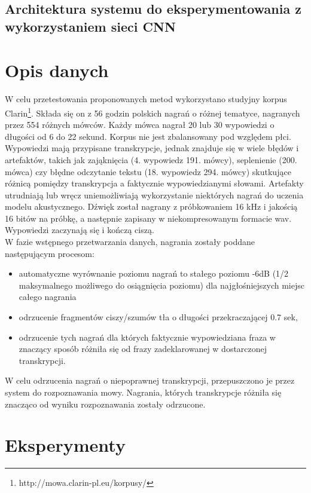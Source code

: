 \documentclass[11pt]{article}
\begin{document}
	\subsection{ Architektura systemu do eksperymentowania z wykorzystaniem sieci CNN }
		
\section{Opis danych}
	\label{sec:opis_danych}

	W celu przetestowania proponowanych metod wykorzystano studyjny korpus Clarin\footnote{http://mowa.clarin-pl.eu/korpusy/}. Składa się on z 56 godzin polskich nagrań o różnej tematyce, nagranych przez 554 różnych mówców. Każdy mówca nagrał 20 lub 30 wypowiedzi o długości od 6 do 22 sekund. Korpus nie jest zbalansowany pod względem płci. Wypowiedzi mają przypisane transkrypcje, jednak znajduje się w wiele błędów i artefaktów, takich jak zająknięcia (4. wypowiedz 191. mówcy), seplenienie (200. mówca) czy błędne odczytanie tekstu (18. wypowiedz 294. mówcy) skutkujące różnicą pomiędzy transkrypcja a faktycznie wypowiedzianymi słowami. Artefakty utrudniają lub wręcz uniemożliwiają wykorzystanie niektórych nagrań do uczenia modelu akustycznego. Dźwięk został nagrany z próbkowaniem 16 kHz i jakością 16 bitów na próbkę, a następnie zapisany w niekompresowanym formacie wav. Wypowiedzi zaczynają się i kończą ciszą. 
\\
W fazie wstępnego przetwarzania danych, nagrania zostały poddane następującym procesom:
\begin{itemize}
	\item automatyczne wyrównanie poziomu nagrań to stałego poziomu -6dB (1/2 maksymalnego możliwego do osiągnięcia poziomu) dla najgłośniejszych miejsc całego nagrania
	\item odrzucenie fragmentów ciszy/szumów tła o długości przekraczającej 0.7 sek,
	\item odrzucenie tych nagrań dla których faktycznie wypowiedziana fraza w znaczący sposób różniła się od frazy zadeklarowanej w dostarczonej transkrypcji.
\end{itemize}
W celu odrzucenia nagrań o niepoprawnej transkrypcji, przepuszczono je przez system do rozpoznawania mowy. Nagrania, których transkrypcje różniła się znacząco od wyniku rozpoznawania zostały odrzucone.

\section{Eksperymenty}
\end{document}
